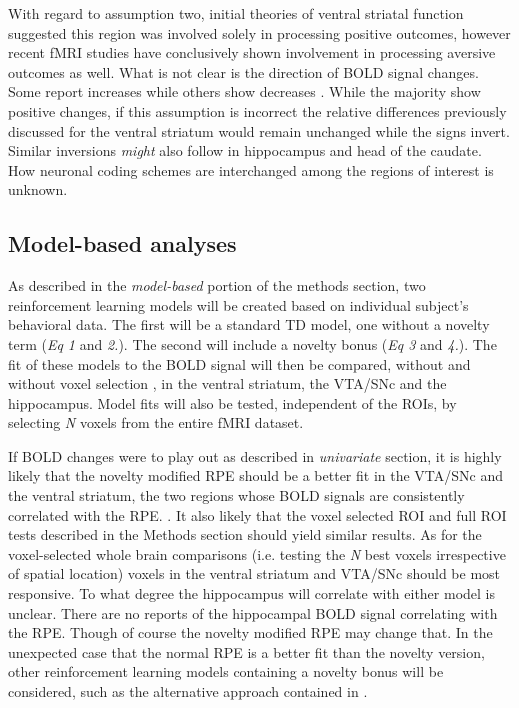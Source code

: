 \documentclass[doc]{apa}        %
\begin{document}
With regard to assumption two, initial theories of ventral striatal function suggested this region was involved solely in processing positive outcomes, however recent fMRI studies have conclusively shown involvement in processing aversive outcomes as well.  What is not clear is the direction of BOLD signal changes.  Some report increases while others show decreases \cite{Levita:2009p7280,Wrase:2007p5236,Seger:2005pd,Seger:2010p7188}.  While the majority show positive changes, if this assumption is incorrect the relative differences previously discussed for the ventral striatum would remain unchanged while the signs invert.  Similar inversions \emph{might} also follow in hippocampus and head of the caudate.  How neuronal coding schemes are interchanged among the regions of interest is unknown.

\subsection{Model-based analyses} %
\label{sub:model_based_analyses}

As described in the \emph{model-based} portion of the methods section, two reinforcement learning models will be created based on individual subject's behavioral data.  The first will be a standard TD model, one without a novelty term (\emph{Eq 1} and \emph{2.}).  The second will include a novelty bonus (\emph{Eq 3} and \emph{4.}).  The fit of these models to the BOLD signal will then be compared, without and without voxel selection \cite{Ashby:2005p4764}, in the ventral striatum, the VTA/SNc and the hippocampus.  Model fits will also be tested, independent of the ROIs, by selecting \emph{N} voxels from the entire fMRI dataset.

If BOLD changes were to play out as described in \emph{univariate} section, it is highly likely that the novelty modified RPE should be a better fit in the VTA/SNc and the ventral striatum, the two regions whose BOLD signals are consistently correlated with the RPE. \cite{Seger:2010p7188,ODoherty:2003p6329,Haruno:2006p3979}.  It also likely that the voxel selected ROI and full ROI tests described in the Methods section should yield similar results.  As for the voxel-selected whole brain comparisons (i.e. testing the \emph{N} best voxels irrespective of spatial location) voxels in the ventral striatum and VTA/SNc should be most responsive.  To what degree the hippocampus will correlate with either model is unclear.  There are no reports of the hippocampal BOLD signal correlating with the RPE.  Though of course the novelty modified RPE may change that. In the unexpected case that the normal RPE is a better fit than the novelty version, other reinforcement learning models containing a novelty bonus will be considered, such as the alternative approach contained in .  


\newpage




\end{document}
